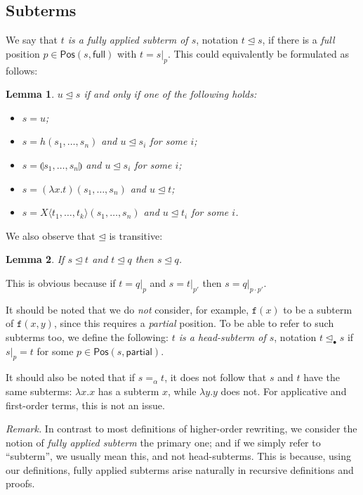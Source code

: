 \documentclass{lmcs}
\theoremstyle{theorem}\newtheorem{theorem}{Theorem}
\theoremstyle{theorem}\newtheorem{lemma}[theorem]{Lemma}
\theoremstyle{theorem}\newtheorem{corollary}[theorem]{Corollary}
\theoremstyle{definition}\newtheorem{definition}[theorem]{Definition}
\theoremstyle{definition}\newtheorem{example}[theorem]{Example}
\newcommand{\Positions}{\mathsf{Pos}}
\newcommand{\identifier}[1]{\mathtt{#1}}
\newcommand{\afun}{\identifier{f}}
\newcommand{\Avar}{X}
\newcommand{\abs}[2]{\lambda #1.#2}
\newcommand{\meta}[2]{#1\langle#2\rangle}
\newcommand{\tuple}[2]{\llparenthesis #1,\dots,#2 \rrparenthesis}
\newcommand{\subtermeq}{\unlhd}
\newcommand{\headsubtermeq}{\unlhd_{\bullet}}
\begin{document}
\subsection{Subterms}

We say that \emph{$t$ is a fully applied subterm of $s$}, notation $t
\subtermeq s$, if there is a \emph{full} position $p \in \Positions(s,
\mathsf{full})$ with $t = s|_p$.  This could equivalently be formulated as
follows:

\begin{lemma}
$u \subtermeq s$ if and only if one of the following holds:
\begin{itemize}
\item $s = u$;
\item $s = h(s_1,\dots,s_n)$ and $u \subtermeq s_i$ for some $i$;
\item $s = \tuple{s_1}{s_n}$ and $u \subtermeq s_i$ for some $i$;
\item $s = (\abs{x}{t})(s_1,\dots,s_n)$ and $u \subtermeq t$;
\item $s = \meta{\Avar}{t_1,\dots,t_k}(s_1,\dots,s_n)$ and $u \subtermeq t_i$
  for some $i$.
\end{itemize}
\end{lemma}

We also observe that $\subtermeq$ is transitive:

\begin{lemma}
If $s \subtermeq t$ and $t \subtermeq q$ then $s \subtermeq q$.
\end{lemma}

This is obvious because if $t = q|_p$ and $s = t|_{p'}$ then $s = q|_{p \cdot p'}$.

It should be noted that we do \emph{not} consider, for example, $\afun(x)$ to be
a subterm of $\afun(x,y)$, since this requires a \emph{partial} position.  To be
able to refer to such subterms too, we define the following: \emph{$t$ is a
head-subterm of $s$}, notation $t \headsubtermeq s$ if $s|_p = t$ for some $p
\in \Positions(s,\mathsf{partial})$.

It should also be noted that if $s =_\alpha t$, it does not follow that $s$ and
$t$ have the same subterms: $\abs{x}{x}$ has a subterm $x$, while $\abs{y}{y}$
does not.  For applicative and first-order terms, this is not an issue.

\emph{Remark.} In contrast to most definitions of higher-order rewriting, we
consider the notion of \emph{fully applied subterm} the primary one; and if we
simply refer to ``subterm'', we usually mean this, and not head-subterms.  This
is because, using our definitions, fully applied subterms arise naturally in
recursive definitions and proofs.
\end{document}
